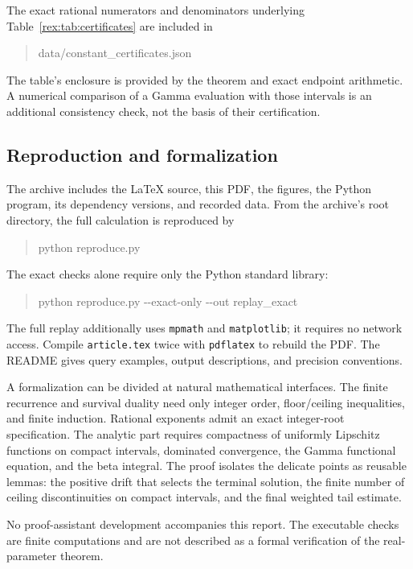 The exact rational numerators and denominators underlying
Table~\ref{rex:tab:certificates} are included in
\begin{quote}\ttfamily
data/constant\_certificates.json
\end{quote}
The table's enclosure is
provided by the theorem and exact endpoint arithmetic. A numerical
comparison of a Gamma evaluation with those intervals is an additional
consistency check, not the basis of their certification.

\subsection{Reproduction and formalization}

The archive includes the LaTeX source, this PDF, the figures, the Python
program, its dependency versions, and recorded data. From the archive's
root directory, the full calculation is reproduced by
\begin{quote}\ttfamily
python reproduce.py
\end{quote}
The exact checks alone require only the Python standard library:
\begin{quote}\ttfamily
python reproduce.py -{}-exact-only -{}-out replay\_exact
\end{quote}
The full replay additionally uses \texttt{mpmath} and
\texttt{matplotlib}; it requires no network access. Compile
\texttt{article.tex} twice with \texttt{pdflatex} to rebuild the PDF.
The README gives query examples, output descriptions, and precision
conventions.

A formalization can be divided at natural mathematical interfaces.
The finite recurrence and survival duality need only integer order,
floor/ceiling inequalities, and finite induction. Rational exponents
admit an exact integer-root specification. The analytic part requires
compactness of uniformly Lipschitz functions on compact intervals,
dominated convergence, the Gamma functional equation, and the beta
integral. The proof isolates the delicate points as reusable lemmas:
the positive drift that selects the terminal solution, the finite
number of ceiling discontinuities on compact intervals, and the final
weighted tail estimate.

No proof-assistant development accompanies this report. The executable
checks are finite computations and are not described as a formal
verification of the real-parameter theorem.

